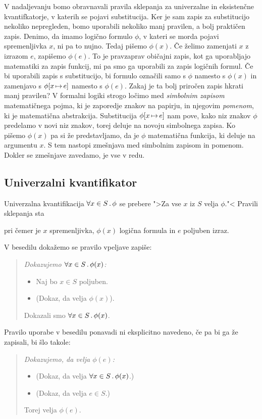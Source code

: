 V nadaljevanju bomo obravnavali pravila sklepanja za univerzalne in
eksistenčne kvantifkatorje, v katerih se pojavi substitucija. Ker je
sam zapis za substitucijo nekoliko nepregleden, bomo uporabili
nekoliko manj pravilen, a bolj praktičen zapis. Denimo, da imamo
logično formulo $\phi$, v kateri se morda pojavi spremenljivka $x$, ni
pa to nujno. Tedaj pišemo $\phi(x)$. Če želimo zamenjati $x$ z izrazom
$e$, zapišemo $\phi(e)$. To je pravzaprav običajni zapis, kot ga
uporabljajo matematiki za zapis funkcij, mi pa smo ga uporabili za
zapis logičnih formul. Če bi uporabili zapis s substitucijo, bi
formulo označili samo s $\phi$ namesto s $\phi(x)$ in zamenjavo s
$\phi[x \,{\mapsto}\, e]$ namesto s $\phi(e)$. Zakaj je ta bolj
priročen zapis hkrati manj pravilen? V formalni logiki strogo ločimo
med \emph{simbolnim zapisom} matematičnega pojma, ki je zaporedje
znakov na papirju, in njegovim \emph{pomenom}, ki je matematična
abstrakcija. Substitucija $\phi[x \,{\mapsto}\, e]$ nam pove, kako
niz znakov $\phi$ predelamo v novi niz znakov, torej deluje na novoju
simbolnega zapisa. Ko pišemo $\phi(x)$ pa si že predstavljamo, da je
$\phi$ matematična funkcija, ki deluje na argumentu $x$. S tem nastopi
zmešnjava med simbolnim zapisom in pomenom. Dokler se zmešnjave
zavedamo, je vse v redu.

\subsection{Univerzalni kvantifikator}
\label{sec:univerzalni-kvantifikator}

Univerzalna kvantifikacija $\forall x \in S \,.\, \phi$ se prebere ">Za vse $x$
iz $S$ velja $\phi$."< Pravili sklepanja sta
%
%
pri čemer je $x$ spremenljivka, $\phi(x)$ logična formula in $e$ poljuben izraz.

V besedilu dokažemo se pravilo vpeljave zapiše:
%
\begin{quote}
  \it
  Dokazujemo $\forall x \in S \,.\, \phi(x)$:
  \begin{itemize}
  \item[] Naj bo $x \in S$ poljuben.
  \item[] (Dokaz, da velja $\phi(x)$).
  \end{itemize}
  Dokazali smo $\forall x \in S \,.\, \phi(x)$.
\end{quote}
%
Pravilo uporabe v besedilu ponavadi ni eksplicitno navedeno, če pa bi
ga že zapisali, bi šlo takole:
%
\begin{quote}
  \it
  Dokazujemo, da velja $\phi(e)$:
  \begin{itemize}
  \item[] (Dokaz, da velja $\forall x \in S \,.\, \phi(x)$.)
  \item[] (Dokaz, da velja $e \in S$.)
  \end{itemize}
  Torej velja $\phi(e)$.
\end{quote}


